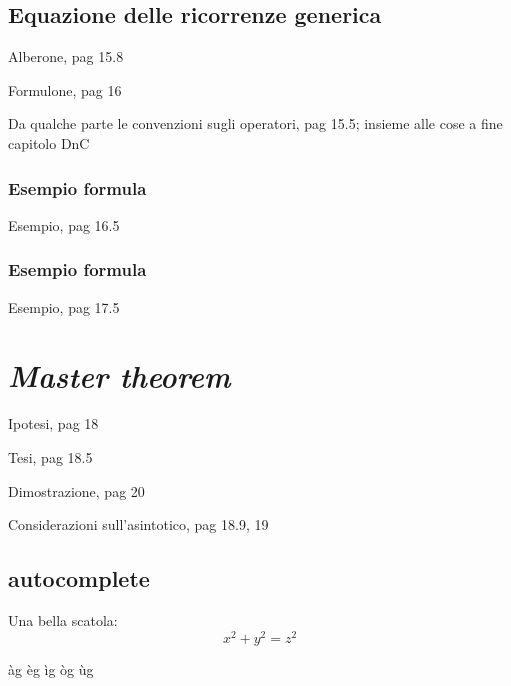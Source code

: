 \subsection{Equazione delle ricorrenze generica}
Alberone, pag 15.8

Formulone, pag 16

Da qualche parte le convenzioni sugli operatori, pag 15.5; insieme alle cose a fine capitolo DnC

\subsubsection{Esempio formula}
Esempio, pag 16.5

\subsubsection{Esempio formula}
Esempio, pag 17.5

\section{\textit{Master theorem}}
Ipotesi, pag 18

Tesi, pag 18.5

Dimostrazione, pag 20

Considerazioni sull'asintotico, pag 18.9, 19

\subsection{autocomplete}
Una bella scatola:
\begin{equation}
    \boxed{x^2+y^2 = z^2}
\end{equation}

àg
èg
ìg
òg
ùg

